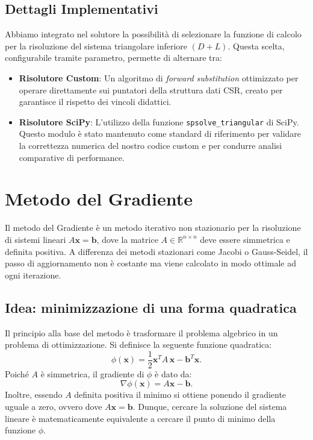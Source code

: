 \documentclass[a4paper, 12pt]{report}
\begin{document}
\subsection*{Dettagli Implementativi}
Abbiamo integrato nel solutore la possibilità di selezionare la funzione di calcolo per la risoluzione del sistema triangolare inferiore $(D+L)$. Questa scelta, configurabile tramite parametro, permette di alternare tra:
\begin{itemize}
    \item \textbf{Risolutore Custom}: Un algoritmo di \textit{forward substitution} ottimizzato per operare direttamente sui puntatori della struttura dati CSR, creato per garantisce il rispetto dei vincoli didattici.
    \item \textbf{Risolutore SciPy}: L'utilizzo della funzione \texttt{spsolve\_triangular} di SciPy. Questo modulo è stato mantenuto come standard di riferimento per validare la correttezza numerica del nostro codice custom e per condurre analisi comparative di performance.
\end{itemize}

\section{Metodo del Gradiente}

Il metodo del Gradiente è un metodo iterativo
non stazionario per la risoluzione di sistemi lineari $A\mathbf{x} = \mathbf{b}$,
dove la matrice $A \in \mathbb{R}^{n \times n}$ deve essere simmetrica e definita
positiva. A differenza dei metodi stazionari come Jacobi o Gauss-Seidel,
il passo di aggiornamento non è costante ma viene calcolato in modo ottimale
ad ogni iterazione.

\subsection*{Idea: minimizzazione di una forma quadratica}

Il principio alla base del metodo è trasformare il problema algebrico in
un problema di ottimizzazione. Si definisce la seguente funzione quadratica:
\[
    \phi(\mathbf{x}) = \frac{1}{2}\mathbf{x}^T A\,\mathbf{x} - \mathbf{b}^T\mathbf{x}.
\]
Poiché $A$ è simmetrica, il gradiente di $\phi$ è dato da:
\[
    \nabla\phi(\mathbf{x}) = A\mathbf{x} - \mathbf{b}.
\]
Inoltre, essendo $A$ definita positiva il minimo si ottiene ponendo il gradiente uguale a zero,
ovvero dove $A\mathbf{x} = \mathbf{b}$. Dunque, cercare la soluzione del
sistema lineare è matematicamente equivalente a cercare il punto di minimo
della funzione $\phi$.
\end{document}
